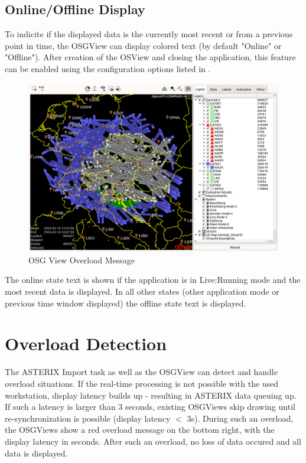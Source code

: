 \subsection{Online/Offline Display}

To indicite if the displayed data is the currently most recent or from a previous point in time, the OSGView can display colored text (by default "Online" or "Offline"). After creation of the OSView and closing the application, this feature can be enabled using the configuration options listed in .

\begin{figure}[H]
    \hspace*{-2.5cm}
    \includegraphics[width=19cm,frame]{figures/osgview_offline_status.png}
  \caption{OSG View Overload Message}
\end{figure} 

The online state text is shown if the application is in Live:Running mode and the most recent data is displayed. In all other states (other application mode or previous time window displayed) the offline state text is displayed.


\section{Overload Detection}

The ASTERIX Import task as well as the OSGView can detect and handle overload situations. If the real-time processing is not possible with the used workstation, display latency builds up - resulting in ASTERIX data queuing up. \\

If such a latency is larger than 3 seconds,  existing OSGViews skip drawing until re-synchronization is possible (display latency $<$ 3s). During such an overload, the OSGViews show a red overload message on the bottom right, with the display latency in seconds. After such an overload, no loss of data occured and all data is displayed. \\

